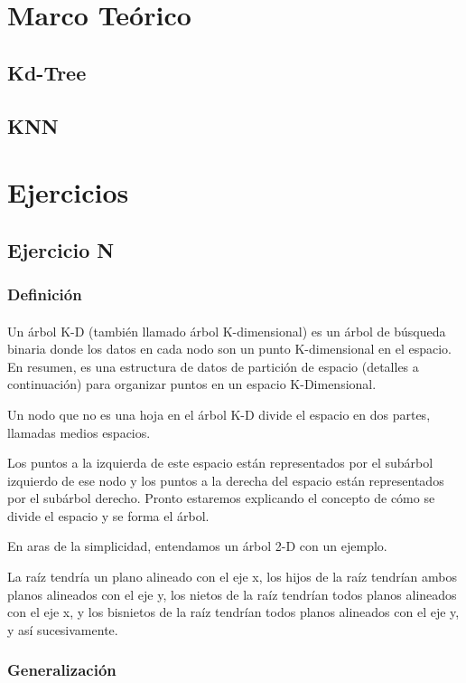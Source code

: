 \documentclass{article}
\begin{document}
\section{Marco Teórico}
\subsection{Kd-Tree}
\subsection{KNN}
\section{Ejercicios}
\subsection{Ejercicio N}
\subsubsection{Definición}
\paragraph{}
Un árbol K-D (también llamado árbol K-dimensional) es un árbol de búsqueda binaria donde los datos en cada nodo son un punto K-dimensional en el espacio. En resumen, es una estructura de datos de partición de espacio (detalles a continuación) para organizar puntos en un espacio K-Dimensional.

Un nodo que no es una hoja en el árbol K-D divide el espacio en dos partes, llamadas medios espacios.

Los puntos a la izquierda de este espacio están representados por el subárbol izquierdo de ese nodo y los puntos a la derecha del espacio están representados por el subárbol derecho. Pronto estaremos explicando el concepto de cómo se divide el espacio y se forma el árbol.

En aras de la simplicidad, entendamos un árbol 2-D con un ejemplo.

La raíz tendría un plano alineado con el eje x, los hijos de la raíz tendrían ambos planos alineados con el eje y, los nietos de la raíz tendrían todos planos alineados con el eje x, y los bisnietos de la raíz tendrían todos planos alineados con el eje y, y así sucesivamente.

\subsubsection{Generalización}
\end{document}
